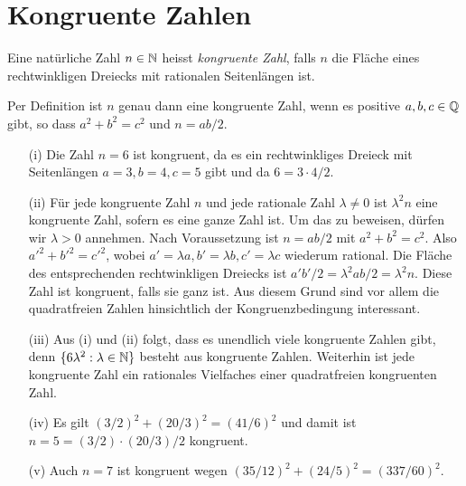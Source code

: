 \chapter{Kongruente Zahlen}

\begin{definition}
  Eine natürliche Zahl $n\in{\mathbb{N}}$ heisst \emph{kongruente
    Zahl}, falls
  $n$ die Fläche eines rechtwinkligen Dreiecks mit rationalen
  Seitenlängen ist. 
\end{definition}

\begin{bemerkung}
  Per Definition ist $n$ genau dann eine kongruente Zahl, wenn es positive
  $a,b,c\in{\mathbb{Q}}$ gibt, so dass $a^2+b^2=c^2$ und $n = ab/2$. 
\end{bemerkung}

\begin{beispiele}\leavevmode
  \begin{enumerate}
  \item [(i)]
    Die Zahl $n=6$ ist kongruent, da es ein rechtwinkliges Dreieck mit Seitenlängen
    $a=3,b=4,c=5$  gibt und da $6=3\cdot 4/2$. 
  \item[(ii)]
    Für jede kongruente Zahl $n$ und jede rationale Zahl
    $\lambda\not=0$ ist $\lambda^2 n$ eine kongruente Zahl, sofern es
    eine ganze Zahl ist. Um das zu
    beweisen, dürfen wir $\lambda > 0$ annehmen. Nach Voraussetzung
    ist $n=ab/2$ mit $a^2+b^2=c^2$. Also ${a'}^2+{b'}^2={c'}^2$, wobei
    $a'=\lambda a, b'=\lambda b, c'=\lambda c$ wiederum rational.
    Die Fläche des entsprechenden rechtwinkligen Dreiecks ist
     $a'b'/2
    = \lambda^2 ab/2 = \lambda^2 n$. Diese Zahl ist kongruent, falls
    sie ganz ist.
    Aus diesem Grund sind vor allem die quadratfreien Zahlen
    hinsichtlich der Kongruenzbedingung interessant. 
  \item[(iii)]
    Aus (i) und (ii) folgt, dass es unendlich viele kongruente Zahlen
    gibt, denn $\{6\lambda^2 : \lambda\in{\mathbb{N}}\}$ besteht aus kongruente
    Zahlen.
    Weiterhin ist jede kongruente Zahl ein rationales Vielfaches
    einer quadratfreien kongruenten Zahl.

  \item[(iv)] Es gilt $(3/2)^2 +(20/3)^2 = (41/6)^2$  und damit ist
    $n=5= (3/2)\cdot(20/3)/2$ kongruent.
    
  \item[(v)] Auch $n=7$ ist kongruent wegen $(35/12)^2 +
    (24/5)^2=(337/60)^2$.

  \end{enumerate}  
\end{beispiele}

